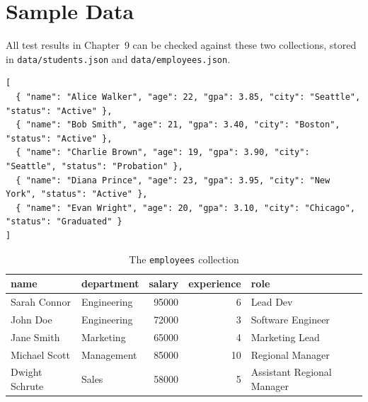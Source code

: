\documentclass[12pt,a4paper]{report}
\newcommand{\codeus}{\textunderscore\allowbreak}
\DeclareRobustCommand{\code}[1]{\texttt{\let\_\codeus #1}}
\begin{document}
\section{Sample Data}\label{sec:data}
All test results in Chapter~9 can be checked against these two collections, stored in \code{data/students.json} and \code{data/employees.json}.
\begin{lstlisting}[basicstyle=\ttfamily\scriptsize\setstretch{1.0}]
[
  { "name": "Alice Walker", "age": 22, "gpa": 3.85, "city": "Seattle", "status": "Active" },
  { "name": "Bob Smith", "age": 21, "gpa": 3.40, "city": "Boston", "status": "Active" },
  { "name": "Charlie Brown", "age": 19, "gpa": 3.90, "city": "Seattle", "status": "Probation" },
  { "name": "Diana Prince", "age": 23, "gpa": 3.95, "city": "New York", "status": "Active" },
  { "name": "Evan Wright", "age": 20, "gpa": 3.10, "city": "Chicago", "status": "Graduated" }
]
\end{lstlisting}
\begin{table}[H]
\centering\small
\begin{tabular}{|l|l|r|r|l|}
\hline
\textbf{name} & \textbf{department} & \textbf{salary} & \textbf{experience} & \textbf{role} \\ \hline
Sarah Connor & Engineering & 95000 & 6 & Lead Dev \\ \hline
John Doe & Engineering & 72000 & 3 & Software Engineer \\ \hline
Jane Smith & Marketing & 65000 & 4 & Marketing Lead \\ \hline
Michael Scott & Management & 85000 & 10 & Regional Manager \\ \hline
Dwight Schrute & Sales & 58000 & 5 & Assistant Regional Manager \\ \hline
\end{tabular}
\caption{The \code{employees} collection}
\end{table}
\end{document}
